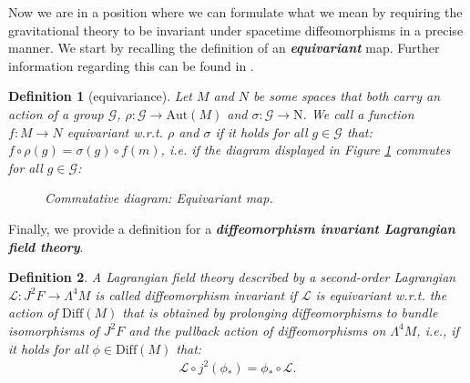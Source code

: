 \documentclass[a4paper,12pt, DIV=14, BCOR=5mm, twoside, headsepline, numbers=noenddot]{scrbook}
\newtheorem{definition}{Definition}[section]
\begin{document}
Now we are in a position where we can formulate what we mean by requiring the gravitational theory to be invariant under spacetime diffeomorphisms in a precise manner. We start by recalling the definition of an \textit{\textbf{equivariant}} map. Further information regarding this can be found in \cite{doi:10.1142/3867}.
\begin{definition}[equivariance]
Let $M$ and $N$ be some spaces that both carry an action of a group $\mathcal{G}$, $\rho : \mathcal{G} \rightarrow \mathrm{Aut}(M)$ and $\sigma : \mathcal{G} \rightarrow \mathrm{N}$. We call a function $f : M \rightarrow N$ equivariant w.r.t. $\rho$ and $\sigma$ if it holds for all $g \in \mathcal{G}$ that: $f \circ \rho(g) = \sigma(g) \circ f(m)$, i.e. if the diagram displayed in Figure \ref{EquiDia} commutes for all $g \in \mathcal{G}$:
\begin{figure}[hbt!]
\centering
{}
\caption{Commutative diagram: Equivariant map.}\label{EquiDia}
\end{figure}
\end{definition}
Finally, we provide a definition for a \textit{\textbf{diffeomorphism invariant Lagrangian field theory}}.
\begin{definition}
A Lagrangian field theory described by a second-order Lagrangian $\mathcal{L} : J^2F \rightarrow \Lambda^4 M$ is called diffeomorphism invariant if $\mathcal{L}$ is equivariant w.r.t. the action of $\mathrm{Diff}(M)$ that is obtained by prolonging diffeomorphisms to bundle isomorphisms of $J^2F$ and the pullback action of diffeomorphisms on $\Lambda^4M$, i.e., if it holds for all $\phi \in \mathrm{Diff}(M)$ that: 
\begin{align}
     \mathcal{L}\circ j^2(\phi_{\ast}) = \phi_{\ast} \circ \mathcal{L}.
\end{align}
\end{definition}
\end{document}

